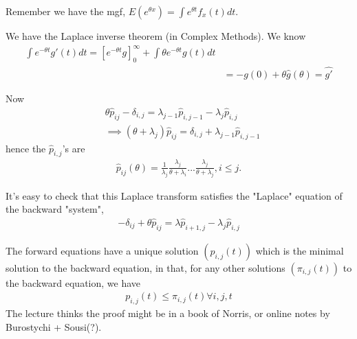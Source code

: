 \documentclass[a4paper]{article}
\begin{document}
Remember we have the mgf, $E(e^{\theta x}) = \int e^{\theta t} f_x(t) dt$.

We have the Laplace inverse theorem (in Complex Methods). We know
\begin{equation*}
\begin{aligned}
\int e^{-\theta t} g'(t) dt = [e^{-\theta t} g]_0^\infty + \int \theta e^{-\theta t} g(t) dt\\
&= -g(0) + \theta \hat{g}(\theta) = \hat{g'}
\end{aligned}
\end{equation*}

Now
\begin{equation*}
\begin{aligned}
&\theta \hat{p}_{ij} - \delta_{i,j} = \lambda_{j-1} \hat{p}_{i,j-1} - \lambda_j \hat{p}_{i,j}\\
&\implies (\theta+\lambda_j) \hat{p}_{ij} = \delta_{i,j} + \lambda_{j-1} \hat{p}_{i,j-1}
\end{aligned}
\end{equation*}
hence the $\hat{p}_{i,j}$'s are
\begin{equation*}
\begin{aligned}
\hat{p}_{ij}(\theta) = \frac{1}{\lambda_j} \frac{\lambda_j}{\theta+\lambda_i} ... \frac{\lambda_j}{\theta+\lambda_j}, i \leq j.
\end{aligned}
\end{equation*}

It's easy to check that this Laplace transform satisfies the "Laplace" equation of the backward "system",
\begin{equation*}
\begin{aligned}
-\delta_{ij} + \theta \hat{p}_{ij} = \lambda \hat{p}_{i+1,j} -\lambda_j \hat{p}_{i,j}
\end{aligned}
\end{equation*}

\begin{thm}
The forward equations have a unique solution $(p_{i,j}(t))$ which is the minimal solution to the backward equation, in that, for any other solutions $(\pi_{i,j}(t))$ to the backward equation, we have
\begin{equation*}
\begin{aligned}
p_{i,j}(t) \leq \pi_{i,j}(t) \forall i,j,t
\end{aligned}
\end{equation*}
The lecture thinks the proof might be in a book of Norris, or online notes by Burostychi + Sousi(?).
\end{thm}
\end{document}
